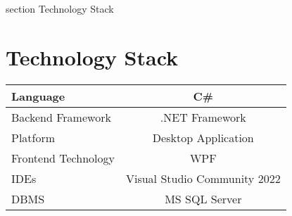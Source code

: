 

 {section} {Technology Stack}
\section*{Technology Stack}
\label{Technology Stack}

\begin{table}[H]
\begin{tabular}{|l|c|}
\hline
Language            & C\#                              \\ \hline
Backend Framework   & .NET Framework                 \\ \hline
Platform            & Desktop Application                \\ \hline
Frontend Technology & WPF \\ \hline
IDEs                & Visual Studio Community 2022     \\ \hline
DBMS                & MS SQL Server                    \\ \hline
\end{tabular}
\end{table}

\clearpage